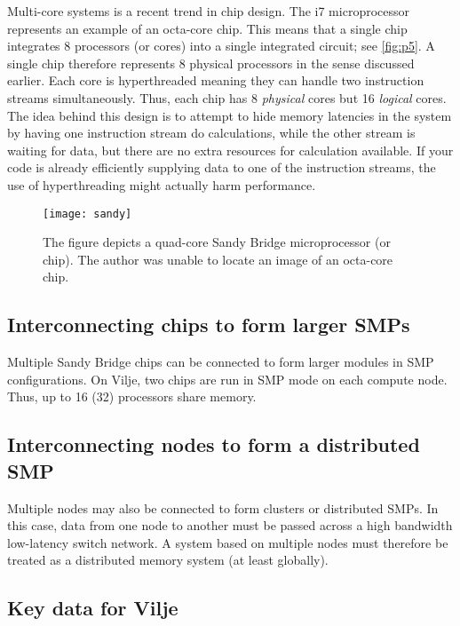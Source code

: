 Multi-core systems is a recent trend in chip design. The i7 microprocessor
represents an example of an octa-core chip. This means that a single chip
integrates 8 processors (or cores) into a single integrated circuit; see
\autoref{fig:p5}. A single chip therefore represents 8 physical processors in
the sense discussed earlier. Each core is hyperthreaded meaning they can handle
two instruction streams simultaneously. Thus, each chip has 8 \emph{physical}
cores but 16 \emph{logical} cores. The idea behind this design is to attempt to
hide memory latencies in the system by having one instruction stream do
calculations, while the other stream is waiting for data, but there are no extra
resources for calculation available. If your code is already efficiently
supplying data to one of the instruction streams, the use of hyperthreading
might actually harm performance.

\begin{figure}[htbp]
  \begin{center}
    \texttt{[image: sandy]}
  \end{center}
  \caption{
    The figure depicts a quad-core Sandy Bridge microprocessor (or chip). The
    author was unable to locate an image of an octa-core chip.
  }
  \label{fig:p5}
\end{figure}

\subsection{Interconnecting chips to form larger SMPs}

Multiple Sandy Bridge chips can be connected to form larger modules in SMP
configurations. On Vilje, two chips are run in SMP mode on each compute node.
Thus, up to 16 (32) processors share memory.

\subsection{Interconnecting nodes to form a distributed SMP}

Multiple nodes may also be connected to form clusters or distributed SMPs. In
this case, data from one node to another must be passed across a high bandwidth
low-latency switch network. A system based on multiple nodes must therefore be
treated as a distributed memory system (at least globally).

\subsection{Key data for Vilje}

